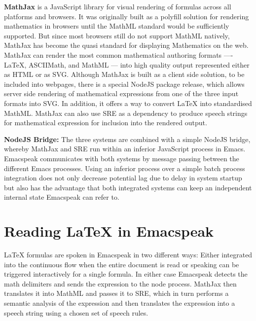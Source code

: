 \documentclass{sig-alternate-05-2015}
\newcommand{\latex}{\LaTeX\xspace}
\newcommand{\sre}{SRE\xspace}
\begin{document}
\textbf{MathJax} is a JavaScript library for visual rendering of formulas across
all platforms and browsers. It was originally built as a polyfill solution for
rendering mathematics in browsers until the MathML standard would be
sufficiently supported. But since most browsers still do not support MathML
natively, MathJax has become the quasi standard for displaying Mathematics on
the web.  MathJax can render the most common mathematical authoring formats ----
{\latex}, ASCIIMath, and MathML --- into high quality output represented either
as HTML or as SVG.  Although MathJax is built as a client side solution, to be
included into webpages, there is a special NodeJS package release, which allows
server side rendering of mathematical expressions from one of the three input
formats into SVG. In addition, it offers a way to convert {\latex} into
standardised MathML. MathJax can also use \sre as a dependency to produce speech
strings for mathematical expression for inclusion into the rendered output.

\textbf{NodeJS Bridge:} The three systems are combined with a simple NodeJS
bridge, whereby MathJax and \sre run within an inferior JavaScript process in
Emacs. Emacspeak communicates with both systems by message passing
between the different Emacs processes.  Using an inferior process over a simple
batch process integration does not only decrease potential lag due to delay in
system startup but also has the advantage that both integrated systems can keep
an independent internal state Emacspeak can refer to.



\section{Reading {\LaTeX} in Emacspeak}
\label{sec:rendering}

{\LaTeX} formulas are spoken in Emacspeak in two different ways: Either
integrated into the continuous flow when the entire document is read or
speaking can be triggered interactively for a single formula. In either case
Emacspeak detects the math delimiters and sends the expression to the node
process. MathJax then translates it into MathML and passes it to \sre, which in
turn performs a semantic analysis of the expression and then translates the
expression into a speech string using a chosen set of speech rules.

\end{document}
